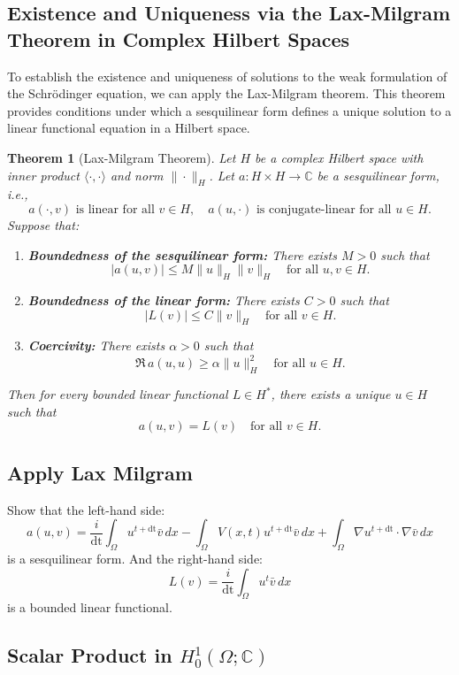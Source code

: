 \documentclass{article}
\theoremstyle{definition}
\theoremstyle{plain}
\newtheorem{theorem}[definition]{Theorem}
\theoremstyle{remark}
\newcommand{\dt}{\text{dt}}
\begin{document}
\subsection*{Existence and Uniqueness via the Lax-Milgram Theorem in Complex Hilbert Spaces}
To establish the existence and uniqueness of solutions to the weak formulation of the Schrödinger equation, we can apply the Lax-Milgram theorem. 
This theorem provides conditions under which a sesquilinear form defines a unique solution to a linear functional equation in a Hilbert space.
\begin{theorem}
[Lax-Milgram Theorem]
Let $H$ be a complex Hilbert space with inner product $\langle \cdot, \cdot \rangle$ and norm $\| \cdot \|_H$. Let $a : H \times H \to \mathbb{C}$ be a sesquilinear form, i.e.,
\[
a(\cdot, v) \text{ is linear for all } v \in H, \quad a(u, \cdot) \text{ is conjugate-linear for all } u \in H.
\]
Suppose that:
\begin{enumerate}
    \item \textbf{Boundedness of the sesquilinear form:} There exists $M > 0$ such that
    \[
    |a(u, v)| \leq M \|u\|_H \|v\|_H \quad \text{for all } u, v \in H.
    \]
    \item \textbf{Boundedness of the linear form:} There exists $C > 0$ such that
    \[
    |L(v)| \leq C \|v\|_H \quad \text{for all } v \in H.
    \]
    \item \textbf{Coercivity:} There exists $\alpha > 0$ such that
    \[
    \Re \, a(u, u) \geq \alpha \|u\|_H^2 \quad \text{for all } u \in H.
    \]
\end{enumerate}
Then for every bounded linear functional $L \in H^*$, there exists a unique $u \in H$ such that
\[
a(u, v) = L(v) \quad \text{for all } v \in H.
\]
\end{theorem}


\subsection*{Apply Lax Milgram}

Show that the left-hand side: 
$$a(u,v) = \frac{i}{\dt} \int_{\Omega} u^{t + \dt} \bar{v} \, dx -  \int_{\Omega} V(x,t) u^{t + \dt} \bar{v} \, dx + \int_{\Omega} \nabla u^{t + \dt} \cdot \nabla \bar{v} \, dx$$ is a sesquilinear form.
And the right-hand side: $$L(v) = \frac{i}{\dt} \int_{\Omega} u^t \bar{v} \, dx $$ is a bounded linear functional.

\subsection*{Scalar Product in $H_0^1(\Omega; \mathbb{C})$}
\end{document}
